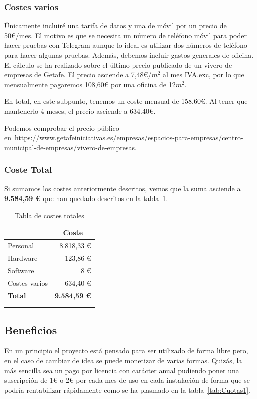 \subsubsection{Costes varios}
Únicamente incluiré una tarifa de datos y una de móvil por un precio de 50€/mes.
El motivo es que se necesita un número de teléfono móvil para poder hacer pruebas con Telegram aunque lo ideal es utilizar dos números de teléfono para hacer algunas pruebas.
Además, debemos incluir gastos generales de oficina. El cálculo se ha realizado sobre el último precio publicado de un vivero de empresas de Getafe. El precio asciende a 7,48€/$m^{2}$ al mes IVA.exc, por lo que mensualmente pagaremos 108,60€ por una oficina de 12$m^{2}$.

En total, en este subpunto, tenemos un coste mensual de 158,60€. Al tener que mantenerlo 4 meses, el precio asciende a 634.40€.

Podemos comprobar el precio público en~\url{https://www.getafeiniciativas.es/empresas/espacios-para-empresas/centro-municipal-de-empresas/vivero-de-empresas}.

\subsubsection{Coste Total}
Si sumamos los costes anteriormente descritos, vemos que la suma asciende a \textbf{9.584,59 €} que han quedado descritos en la tabla~\ref{tab:CosteTotal}.

\begin{longtable}[c]{@{}lr@{}}
\toprule
\centering
\multicolumn{1}{c}{\textbf{Concepto}} & \multicolumn{1}{c}{\textbf{Coste}} \\* \midrule
\endfirsthead
%
\endhead
%
\bottomrule
\endfoot
%
\endlastfoot
%
Personal & 8.818,33 € \\
Hardware & 123,86 € \\
Software & 8 € \\
Costes varios & 634,40 € \\\midrule
\textbf{Total} & \textbf{9.584,59 €} \\ \bottomrule \\
\caption{Tabla de costes totales} 
\label{tab:CosteTotal}
\end{longtable}

\subsection{Beneficios}
En un principio el proyecto está pensado para ser utilizado de forma libre pero, en el caso de cambiar de idea se puede monetizar de varias formas. Quizás, la más sencilla sea un pago por licencia con carácter anual pudiendo poner una suscripción de 1€ o 2€ por cada mes de uso en cada instalación de forma que se podría rentabilizar rápidamente como se ha plasmado en la tabla~\ref{tab:Cuotas1}.


